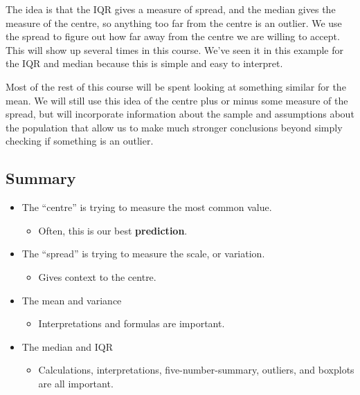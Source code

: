 \documentclass[
  letterpaper,
  DIV=11,
  numbers=noendperiod]{scrreprt}
\providecommand{\tightlist}{%
  \setlength{\itemsep}{0pt}\setlength{\parskip}{0pt}}\usepackage{longtable,booktabs,array}
\begin{document}
The idea is that the IQR gives a measure of spread, and the median gives
the measure of the centre, so anything too far from the centre is an
outlier. We use the spread to figure out how far away from the centre we
are willing to accept. This will show up several times in this course.
We've seen it in this example for the IQR and median because this is
simple and easy to interpret.

Most of the rest of this course will be spent looking at something
similar for the mean. We will still use this idea of the centre plus or
minus some measure of the spread, but will incorporate information about
the sample and assumptions about the population that allow us to make
much stronger conclusions beyond simply checking if something is an
outlier.

\hypertarget{summary-1}{%
\subsection{Summary}\label{summary-1}}

\begin{itemize}
\tightlist
\item
  The ``centre'' is trying to measure the most common value.

  \begin{itemize}
  \tightlist
  \item
    Often, this is our best \textbf{prediction}.
  \end{itemize}
\item
  The ``spread'' is trying to measure the scale, or variation.

  \begin{itemize}
  \tightlist
  \item
    Gives context to the centre.
  \end{itemize}
\item
  The mean and variance

  \begin{itemize}
  \tightlist
  \item
    Interpretations and formulas are important.
  \end{itemize}
\item
  The median and IQR

  \begin{itemize}
  \tightlist
  \item
    Calculations, interpretations, five-number-summary, outliers, and
    boxplots are all important.
  \end{itemize}
\end{itemize}
\end{document}
